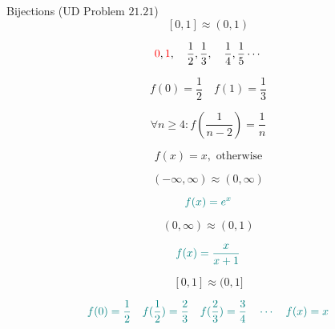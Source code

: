 \begin{frame}{}
  \begin{exampleblock}{Bijections (UD Problem $21.21$)}
    \[
      [0, 1] \approx (0, 1)
    \]
  \end{exampleblock}

  \pause
  \[
    \textcolor{red}{0}, \textcolor{red}{1}, \quad \frac{1}{2}, \frac{1}{3}, \quad \frac{1}{4}, \frac{1}{5} \cdots
  \]

  \pause
  \[
    f(0) = \frac{1}{2} \quad f(1) = \frac{1}{3}
  \]

  \pause
  \[
    \forall n \ge 4: f(\frac{1}{n-2}) = \frac{1}{n}
  \]

  \pause
  \[
    f(x) = x, \text{ otherwise}
  \]
\end{frame}

\begin{frame}{}
  \[
    (-\infty, \infty) \approx (0, \infty)
  \]

  \pause
  \[
    \textcolor{teal}{f(x) = e^{x}}
  \]

  \pause
  \[
    (0, \infty) \approx (0, 1)
  \]

  \pause
  \[
    \textcolor{teal}{f(x) = \frac{x}{x+1}}
  \]

  \pause
  \[
    [0, 1] \approx (0, 1]
  \]

  \pause
  \[
    \textcolor{teal}{f(0) = \frac{1}{2} \quad f(\frac{1}{2}) = \frac{2}{3} \quad f(\frac{2}{3}) = \frac{3}{4} \quad \cdots \quad f(x) = x}
  \]
\end{frame}
